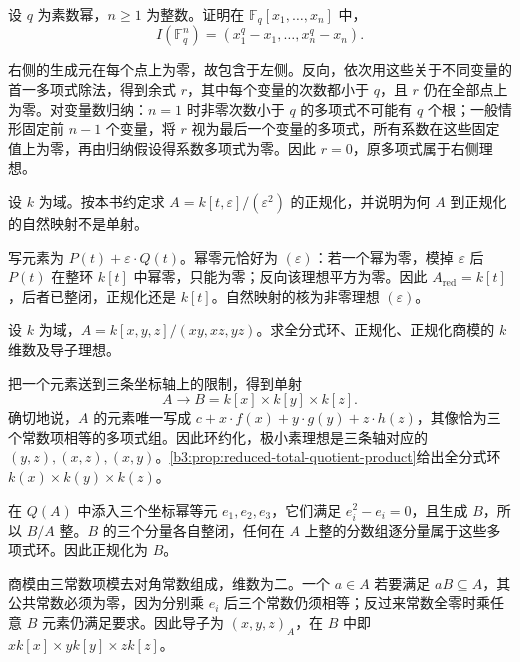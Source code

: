 \begin{exercise}\label{b3:ex:06-finite-field-vanishing}
	设 \(q\) 为素数幂，\(n\ge1\) 为整数。证明在 \(\mathbb F_q[x_1,\ldots,x_n]\) 中，
	\[
		I(\mathbb F_q^n)=(x_1^q-x_1,\ldots,x_n^q-x_n).
	\]
\end{exercise}
\begin{solution}
	右侧的生成元在每个点上为零，故包含于左侧。反向，依次用这些关于不同变量的首一多项式除法，得到余式 \(r\)，其中每个变量的次数都小于 \(q\)，且 \(r\) 仍在全部点上为零。对变量数归纳：\(n=1\) 时非零次数小于 \(q\) 的多项式不可能有 \(q\) 个根；一般情形固定前 \(n-1\) 个变量，将 \(r\) 视为最后一个变量的多项式，所有系数在这些固定值上为零，再由归纳假设得系数多项式为零。因此 \(r=0\)，原多项式属于右侧理想。
\end{solution}

\begin{exercise}\label{b3:ex:06-nonreduced-normalization}
	设 \(k\) 为域。按本书约定求 \(A=k[t,\varepsilon]/(\varepsilon^2)\) 的正规化，并说明为何 \(A\) 到正规化的自然映射不是单射。
\end{exercise}
\begin{solution}
	写元素为 \(P(t)+\varepsilon\cdot Q(t)\)。幂零元恰好为 \((\varepsilon)\)：若一个幂为零，模掉 \(\varepsilon\) 后 \(P(t)\) 在整环 \(k[t]\) 中幂零，只能为零；反向该理想平方为零。因此 \(A_{\mathrm{red}}=k[t]\)，后者已整闭，正规化还是 \(k[t]\)。自然映射的核为非零理想 \((\varepsilon)\)。
\end{solution}



\begin{exercise}\label{b3:ex:06-three-axes}
	设 \(k\) 为域，\(A=k[x,y,z]/(xy,xz,yz)\)。求全分式环、正规化、正规化商模的 \(k\) 维数及导子理想。
\end{exercise}
\begin{solution}
	把一个元素送到三条坐标轴上的限制，得到单射
	\[
		A\longrightarrow B=k[x]\times k[y]\times k[z].
	\]
	确切地说，\(A\) 的元素唯一写成 \(c+x\cdot f(x)+y\cdot g(y)+z\cdot h(z)\)，其像恰为三个常数项相等的多项式组。因此环约化，极小素理想是三条轴对应的 \((y,z),(x,z),(x,y)\)。\cref{b3:prop:reduced-total-quotient-product}给出全分式环 \(k(x)\times k(y)\times k(z)\)。

	在 \(Q(A)\) 中添入三个坐标幂等元 \(e_1,e_2,e_3\)，它们满足 \(e_i^2-e_i=0\)，且生成 \(B\)，所以 \(B/A\) 整。\(B\) 的三个分量各自整闭，任何在 \(A\) 上整的分数组逐分量属于这些多项式环。因此正规化为 \(B\)。

	商模由三常数项模去对角常数组成，维数为二。一个 \(a\in A\) 若要满足 \(aB\subseteq A\)，其公共常数必须为零，因为分别乘 \(e_i\) 后三个常数仍须相等；反过来常数全零时乘任意 \(B\) 元素仍满足要求。因此导子为 \((x,y,z)_A\)，在 \(B\) 中即 \(xk[x]\times yk[y]\times zk[z]\)。
\end{solution}

